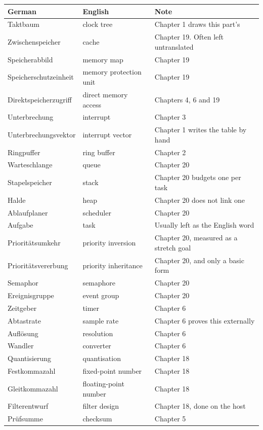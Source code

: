 \begin{table}[H]\centering\small
\begin{tabular}{p{40mm}p{40mm}p{72mm}}
\toprule
German & English & Note \\
\midrule
Taktbaum & clock tree & Chapter 1 draws this part's \\
Zwischenspeicher & cache & Chapter 19. Often left untranslated \\
Speicherabbild & memory map & Chapter 19 \\
Speicherschutzeinheit & memory protection unit & Chapter 19 \\
Direktspeicherzugriff & direct memory access & Chapters 4, 6 and 19 \\
Unterbrechung & interrupt & Chapter 3 \\
Unterbrechungsvektor & interrupt vector & Chapter 1 writes the table by hand \\
Ringpuffer & ring buffer & Chapter 2 \\
Warteschlange & queue & Chapter 20 \\
Stapelspeicher & stack & Chapter 20 budgets one per task \\
Halde & heap & Chapter 20 does not link one \\
Ablaufplaner & scheduler & Chapter 20 \\
Aufgabe & task & Usually left as the English word \\
Priorit\"atsumkehr & priority inversion & Chapter 20, measured as a stretch goal \\
Priorit\"atsvererbung & priority inheritance & Chapter 20, and only a basic form \\
Semaphor & semaphore & Chapter 20 \\
Ereignisgruppe & event group & Chapter 20 \\
Zeitgeber & timer & Chapter 6 \\
Abtastrate & sample rate & Chapter 6 proves this externally \\
Aufl\"osung & resolution & Chapter 6 \\
Wandler & converter & Chapter 6 \\
Quantisierung & quantisation & Chapter 18 \\
Festkommazahl & fixed-point number & Chapter 18 \\
Gleitkommazahl & floating-point number & Chapter 18 \\
Filterentwurf & filter design & Chapter 18, done on the host \\
Pr\"ufsumme & checksum & Chapter 5 \\

\end{tabular}
\end{table}

